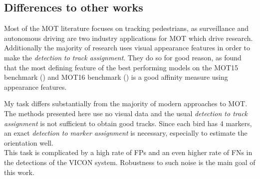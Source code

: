 \documentclass{article}
\begin{document}
\subsection{Differences to other works}

Most of the MOT literature focuses on tracking pedestrians, as surveillance and autonomous driving are two industry applications for MOT which drive research. Additionally the majority of research uses visual appearance features in order to make the \emph{detection to track assignment}. They do so for good reason, as \cite{tracking_the_trackers} found that the most defining feature of the best performing models on the MOT15 benchmark (\cite{MOT15}) and MOT16 benchmark (\cite{MOT16}) is a good affinity measure using appearance features.

My task differs substantially from the majority of modern approaches to MOT. The methods presented here use no visual data and the usual \emph{detection to track assignment} is not sufficient to obtain good tracks. Since each bird has 4 markers, an exact \emph{detection to marker assignment} is necessary, especially to estimate the orientation well. \\
This task is complicated by a high rate of FPs and an even higher rate of FNs in the detections of the VICON system. Robustness to such noise is the main goal of this work.
\end{document}
